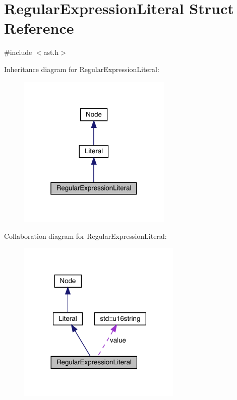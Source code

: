 \hypertarget{struct_regular_expression_literal}{}\section{Regular\+Expression\+Literal Struct Reference}
\label{struct_regular_expression_literal}


{\ttfamily \#include $<$ast.\+h$>$}



Inheritance diagram for Regular\+Expression\+Literal\+:
\nopagebreak
\begin{figure}[H]
\begin{center}
\leavevmode
\includegraphics[width=208pt]{struct_regular_expression_literal__inherit__graph}
\end{center}
\end{figure}


Collaboration diagram for Regular\+Expression\+Literal\+:
\nopagebreak
\begin{figure}[H]
\begin{center}
\leavevmode
\includegraphics[width=221pt]{struct_regular_expression_literal__coll__graph}
\end{center}
\end{figure}
